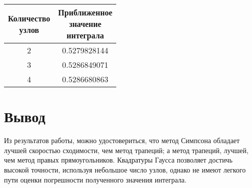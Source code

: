 \documentclass[12pt, a4paper]{article}
\begin{document}
\begin{table}[H]
	\centering
	\begin{tabular}{|c|c|}
	\hline
	\shortstack{Количество\\узлов} & \shortstack{Приближенное \\значение \\ интеграла} \\ \hline
	2 & 0.5279828144 \\ \hline
	3 & 0.5286849071 \\ \hline
	4 & 0.5286680863 \\ \hline
	\end{tabular}
	\end{table}

\section{Вывод}

Из результатов работы, можно удостовериться, что метод Симпсона обладает лучшей
скоростью сходимости, чем метод трапеций; а метод трапеций, лучшей, чем метод
правых прямоугольников. Квадратуры Гаусса позволяет достичь высокой точности,
используя небольшое число узлов, однако не имеют легкого пути оценки погрешности 
полученного значения интеграла.
\end{document}
